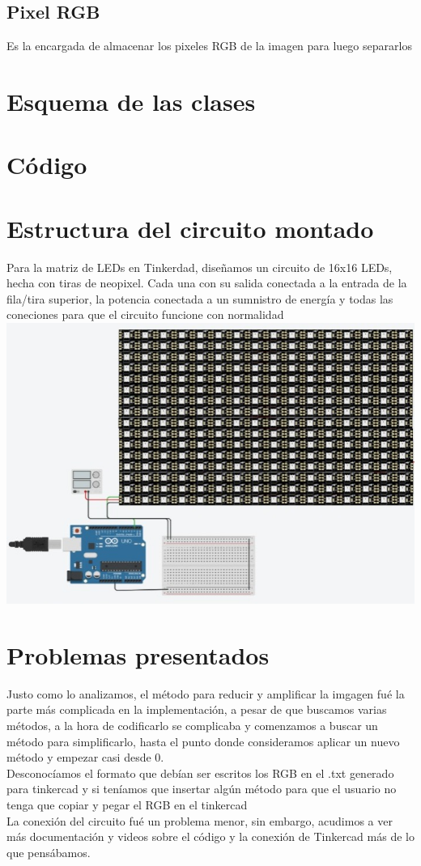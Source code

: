 \documentclass{article}
\begin{document}
\subsection{Pixel RGB}
Es la encargada de almacenar los pixeles RGB de la imagen para luego separarlos\\

\section{Esquema de las clases}

\section{Código}

\section{Estructura del circuito montado}
Para la matriz de LEDs en Tinkerdad, diseñamos un circuito de 16x16 LEDs, hecha con tiras de neopixel. Cada una con su salida conectada a la entrada de la fila/tira superior, la potencia conectada a un sumnistro de energía y todas las coneciones para que el circuito funcione con normalidad\\

\includegraphics[width=14cm]{Imagenes/circuito.jpeg}

\section{Problemas presentados}
Justo como lo analizamos, el método para reducir y amplificar la imgagen fué la parte más complicada en la implementación, a pesar de que buscamos varias métodos, a la hora de codificarlo se complicaba y comenzamos a buscar un método para simplificarlo, hasta el punto donde consideramos aplicar un nuevo método y empezar casi desde 0.\\

Desconocíamos el formato que debían ser escritos los RGB en el .txt generado para tinkercad y si teníamos que insertar algún método para que el usuario no tenga que copiar y pegar el RGB en el tinkercad\\

La conexión del circuito fué un problema menor, sin embargo, acudimos a ver más documentación y videos sobre el código y la conexión de Tinkercad más de lo que pensábamos.
\end{document}
